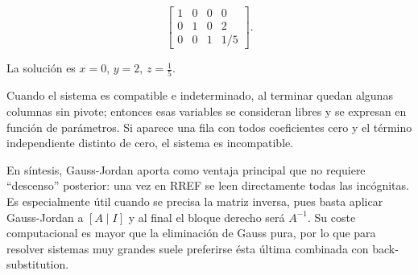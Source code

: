 \[
\left[\begin{array}{ccc|c}
1 & 0 & 0 & 0\\
0 & 1 & 0 & 2\\
0 & 0 & 1 & 1/5
\end{array}\right].
\]

La solución es \(x=0\), \(y=2\), \(z=\tfrac15\).

Cuando el sistema es compatible e indeterminado, al terminar quedan algunas columnas sin pivote; entonces esas variables se consideran libres y se expresan en función de parámetros. Si aparece una fila con todos coeficientes cero y el término independiente distinto de cero, el sistema es incompatible.

En síntesis, Gauss-Jordan aporta como ventaja principal que no requiere “descenso” posterior: una vez en RREF se leen directamente todas las incógnitas. Es especialmente útil cuando se precisa la matriz inversa, pues basta aplicar Gauss-Jordan a \([A\mid I]\) y al final el bloque derecho será \(A^{-1}\). Su coste computacional es mayor que la eliminación de Gauss pura, por lo que para resolver sistemas muy grandes suele preferirse ésta última combinada con back-substitution.
